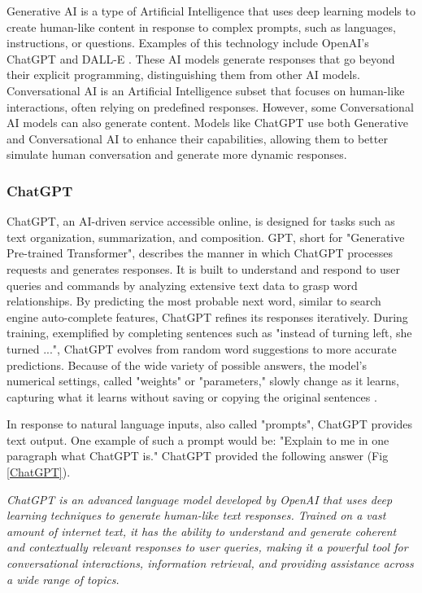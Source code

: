 Generative AI is a type of Artificial Intelligence that uses deep learning models to create human-like content in response to complex prompts, such as languages, instructions, or questions. Examples of this technology include OpenAI’s ChatGPT \cite{ChatGPT} and DALL-E \cite{DallE}. These AI models generate responses that go beyond their explicit programming, distinguishing them from other AI models. Conversational AI is an Artificial Intelligence subset that focuses on human-like interactions, often relying on predefined responses. However, some Conversational AI models can also generate content. Models like ChatGPT use both Generative and Conversational AI to enhance their capabilities, allowing them to better simulate human conversation and generate more dynamic responses. \cite{LimGPPP}

\subsubsection{ChatGPT}
ChatGPT, an AI-driven service accessible online, is designed for tasks such as text organization, summarization, and composition. GPT, short for "Generative Pre-trained Transformer", describes the manner in which ChatGPT processes requests and generates responses. It is built to understand and respond to user queries and commands by analyzing extensive text data to grasp word relationships. By predicting the most probable next word, similar to search engine auto-complete features, ChatGPT refines its responses iteratively. During training, exemplified by completing sentences such as "instead of turning left, she turned ...", ChatGPT evolves from random word suggestions to more accurate predictions. Because of the wide variety of possible answers, the model's numerical settings, called "weights" or "parameters," slowly change as it learns, capturing what it learns without saving or copying the original sentences \cite{OpenAICGPT}.

In response to natural language inputs, also called "prompts", ChatGPT provides text output. One example of such a prompt would be: "Explain to me in one paragraph what ChatGPT is." ChatGPT provided the following answer (Fig \ref{ChatGPT}).

\textit{
	ChatGPT is an advanced language model developed by OpenAI that uses deep learning techniques to generate human-like text responses. Trained on a vast amount of internet text, it has the ability to understand and generate coherent and contextually relevant responses to user queries, making it a powerful tool for conversational interactions, information retrieval, and providing assistance across a wide range of topics.} \cite{OpenAI} 

